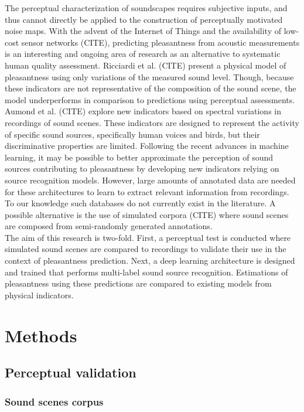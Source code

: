 \documentclass[11pt,a4paper]{article}
\begin{document}
The perceptual characterization of soundscapes requires subjective inputs, and thus cannot directly be applied to the construction of perceptually motivated noise maps. With the advent of the Internet of Things and the availability of low-cost sensor networks (CITE), predicting pleasantness from acoustic measurements is an interesting and ongoing area of research as an alternative to systematic human quality assessment. Ricciardi et al. (CITE) present a physical model of pleasantness using only variations of the measured sound level. Though, because these indicators are not representative of the composition of the sound scene, the model underperforms in comparison to predictions using perceptual assessments. Aumond et al. (CITE) explore new indicators based on spectral variations in recordings of sound scenes. These indicators are designed to represent the activity of specific sound sources, specifically human voices and birds, but their discriminative properties are limited. Following the recent advances in machine learning, it may be possible to better approximate the perception of sound sources contributing to pleasantness by developing new indicators relying on source recognition models. However, large amounts of annotated data are needed for these architectures to learn to extract relevant information from recordings. To our knowledge such databases do not currently exist in the literature. A possible alternative is the use of simulated corpora (CITE) where sound scenes are composed from semi-randomly generated annotations.\\

The aim of this research is two-fold. First, a perceptual test is conducted where simulated sound scenes are compared to recordings to validate their use in the context of pleasantness prediction. Next, a deep learning architecture is designed and trained that performs multi-label sound source recognition. Estimations of pleasantness using these predictions are compared to existing models from physical indicators.

\section{Methods}
\label{sec:methods}


\subsection{Perceptual validation}
\label{sec:pval}


\subsubsection{Sound scenes corpus}
\label{sec:pval_corp}
\end{document}

